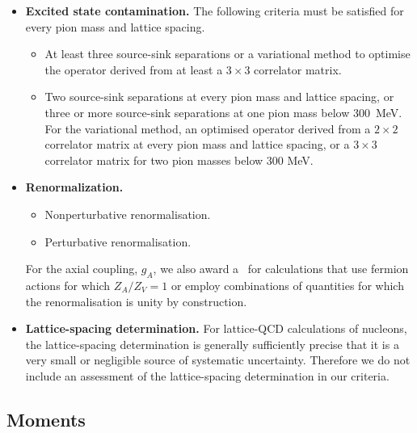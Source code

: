 \begin{itemize}
\item {\bfseries Excited state contamination.} The following criteria must be satisfied for every pion mass and lattice spacing.
\begin{itemize}
\item[\bstar] At least three source-sink  separations or a variational method to optimise the
operator derived from at least a $3\times 3$ correlator matrix. 
\item[\bcirc] Two source-sink separations at every pion mass and lattice spacing, or three or more source-sink separations at one pion mass
below 300~MeV. For the variational method, an optimised operator derived from a $2\times 2$ correlator matrix at every pion mass and
lattice spacing, or a $3\times 3$ correlator matrix for two pion masses below 300 MeV.
\end{itemize}

\item {\bfseries Renormalization.} 
\begin{itemize}
\item[\bstar] Nonperturbative renormalisation.
\item[\bcirc] Perturbative renormalisation.
\end{itemize}
For the axial coupling, $g_A$, we also award a \bstar~for calculations that use fermion actions for which $Z_A/Z_V=1$ or employ combinations of quantities for which the renormalisation is unity by construction.

\item {\bfseries Lattice-spacing determination.} For lattice-QCD calculations of nucleons, the lattice-spacing determination is generally 
sufficiently precise that it is a very small or negligible source
of systematic uncertainty. Therefore we do not include an assessment of the lattice-spacing
determination in our criteria.

\end{itemize}

\subsection{Moments}

